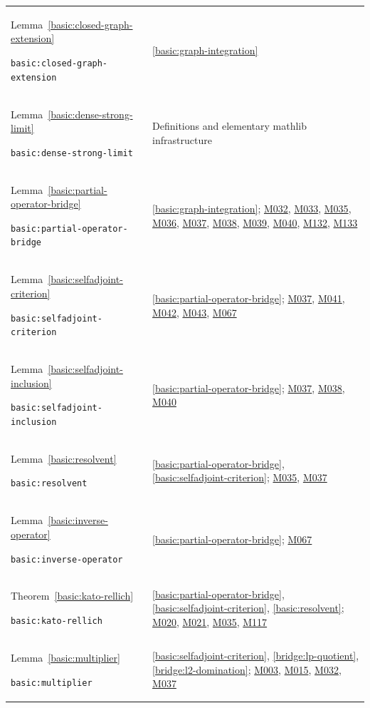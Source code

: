 \documentclass[11pt,a4paper]{article}
\theoremstyle{definition}
\theoremstyle{remark}
\begin{document}
\begin{longtable}{@{}p{}p{}@{}}
Lemma~\ref{basic:closed-graph-extension}\par\nolinkurl{basic:closed-graph-extension} & \ref{basic:graph-integration} \\[4pt]
Lemma~\ref{basic:dense-strong-limit}\par\nolinkurl{basic:dense-strong-limit} & Definitions and elementary mathlib infrastructure \\[4pt]
Lemma~\ref{basic:partial-operator-bridge}\par\nolinkurl{basic:partial-operator-bridge} & \ref{basic:graph-integration}; \hyperref[base:M032]{M032}, \hyperref[base:M033]{M033}, \hyperref[base:M035]{M035}, \hyperref[base:M036]{M036}, \hyperref[base:M037]{M037}, \hyperref[base:M038]{M038}, \hyperref[base:M039]{M039}, \hyperref[base:M040]{M040}, \hyperref[base:M132]{M132}, \hyperref[base:M133]{M133} \\[4pt]
Lemma~\ref{basic:selfadjoint-criterion}\par\nolinkurl{basic:selfadjoint-criterion} & \ref{basic:partial-operator-bridge}; \hyperref[base:M037]{M037}, \hyperref[base:M041]{M041}, \hyperref[base:M042]{M042}, \hyperref[base:M043]{M043}, \hyperref[base:M067]{M067} \\[4pt]
Lemma~\ref{basic:selfadjoint-inclusion}\par\nolinkurl{basic:selfadjoint-inclusion} & \ref{basic:partial-operator-bridge}; \hyperref[base:M037]{M037}, \hyperref[base:M038]{M038}, \hyperref[base:M040]{M040} \\[4pt]
Lemma~\ref{basic:resolvent}\par\nolinkurl{basic:resolvent} & \ref{basic:partial-operator-bridge}, \ref{basic:selfadjoint-criterion}; \hyperref[base:M035]{M035}, \hyperref[base:M037]{M037} \\[4pt]
Lemma~\ref{basic:inverse-operator}\par\nolinkurl{basic:inverse-operator} & \ref{basic:partial-operator-bridge}; \hyperref[base:M067]{M067} \\[4pt]
Theorem~\ref{basic:kato-rellich}\par\nolinkurl{basic:kato-rellich} & \ref{basic:partial-operator-bridge}, \ref{basic:selfadjoint-criterion}, \ref{basic:resolvent}; \hyperref[base:M020]{M020}, \hyperref[base:M021]{M021}, \hyperref[base:M035]{M035}, \hyperref[base:M117]{M117} \\[4pt]
Lemma~\ref{basic:multiplier}\par\nolinkurl{basic:multiplier} & \ref{basic:selfadjoint-criterion}, \ref{bridge:lp-quotient}, \ref{bridge:l2-domination}; \hyperref[base:M003]{M003}, \hyperref[base:M015]{M015}, \hyperref[base:M032]{M032}, \hyperref[base:M037]{M037} \\[4pt]

\end{longtable}
\end{document}

